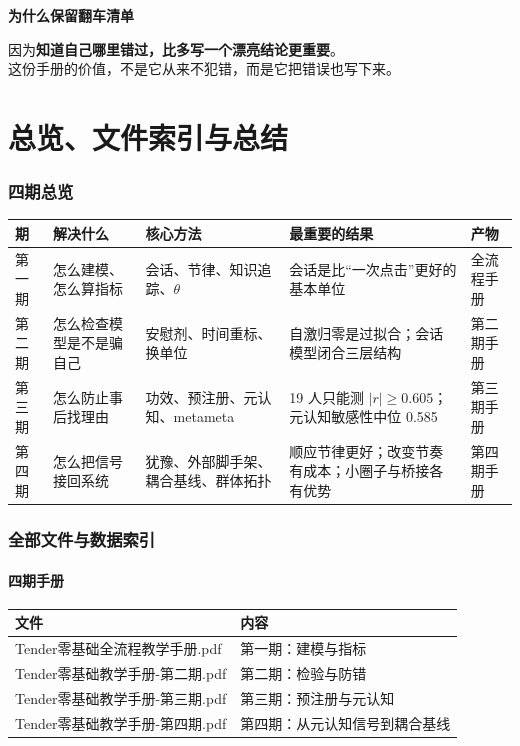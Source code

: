 \documentclass[UTF8,a4paper,11pt]{ctexart}
\newenvironment{explainbox}[1]
{\begin{center}\begin{minipage}{0.94\textwidth}\colorbox{boxbg}{\parbox{0.92\textwidth}{\textbf{#1}\par\vspace{2pt}}}}
{\end{minipage}\end{center}}
\begin{document}
\begin{explainbox}{为什么保留翻车清单}
因为\textbf{知道自己哪里错过，比多写一个漂亮结论更重要}。\\
这份手册的价值，不是它从来不犯错，而是它把错误也写下来。
\end{explainbox}



\part{总览、文件索引与总结}

\section{四期总览}

\begin{center}
\begin{longtable}{@{}p{1.4cm}p{2.6cm}p{3.6cm}p{4.6cm}p{2.6cm}@{}}
\toprule
\textbf{期} & \textbf{解决什么} & \textbf{核心方法} & \textbf{最重要的结果} & \textbf{产物} \\
\midrule
第一期 & 怎么建模、怎么算指标 & 会话、节律、知识追踪、$\theta$ & 会话是比“一次点击”更好的基本单位 & 全流程手册 \\
第二期 & 怎么检查模型是不是骗自己 & 安慰剂、时间重标、换单位 & 自激归零是过拟合；会话模型闭合三层结构 & 第二期手册 \\
第三期 & 怎么防止事后找理由 & 功效、预注册、元认知、metameta & 19 人只能测 $|r|\ge0.605$；元认知敏感性中位 0.585 & 第三期手册 \\
第四期 & 怎么把信号接回系统 & 犹豫、外部脚手架、耦合基线、群体拓扑 & 顺应节律更好；改变节奏有成本；小圈子与桥接各有优势 & 第四期手册 \\
\bottomrule
\end{longtable}
\end{center}


\section{全部文件与数据索引}

\subsection{四期手册}

\begin{longtable}{@{}p{8.6cm}p{5.0cm}@{}}
\toprule
\textbf{文件} & \textbf{内容} \\
\midrule
Tender零基础全流程教学手册.pdf & 第一期：建模与指标 \\
Tender零基础教学手册-第二期.pdf & 第二期：检验与防错 \\
Tender零基础教学手册-第三期.pdf & 第三期：预注册与元认知 \\
Tender零基础教学手册-第四期.pdf & 第四期：从元认知信号到耦合基线 \\
\bottomrule
\end{longtable}
\end{document}
